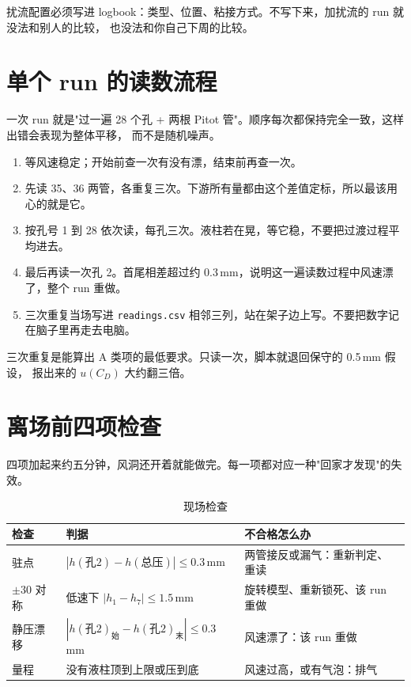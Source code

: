 \documentclass[11pt,a4paper]{ctexart}
\newcommand{\CD}{\ensuremath{C_D}}
\begin{document}
扰流配置必须写进 logbook：类型、位置、粘接方式。不写下来，加扰流的 run 就没法和别人的比较，
也没法和你自己下周的比较。

\section{单个 run 的读数流程}

一次 run 就是"过一遍 28 个孔 + 两根 Pitot 管"。顺序每次都保持完全一致，这样出错会表现为整体平移，
而不是随机噪声。

\begin{enumerate}[leftmargin=1.5em,itemsep=3pt]
\item 等风速稳定；开始前查一次有没有漂，结束前再查一次。
\item 先读 35、36 两管，各重复三次。下游所有量都由这个差值定标，所以最该用心的就是它。
\item 按孔号 1 到 28 依次读，每孔三次。液柱若在晃，等它稳，不要把过渡过程平均进去。
\item 最后再读一次孔 2。首尾相差超过约 0.3\,mm，说明这一遍读数过程中风速漂了，整个 run 重做。
\item 三次重复当场写进 \texttt{readings.csv} 相邻三列，站在架子边上写。不要把数字记在脑子里再走去电脑。
\end{enumerate}

三次重复是能算出 A 类项的最低要求。只读一次，脚本就退回保守的 0.5\,mm 假设，
报出来的 $u(\CD)$ 大约翻三倍。

\section{离场前四项检查}

四项加起来约五分钟，风洞还开着就能做完。每一项都对应一种"回家才发现"的失效。

\begin{table}[H]
\centering
\caption{现场检查}
\small
\begin{tabularx}{\textwidth}{@{}p{3.6cm} X p{6.2cm}@{}}
\toprule
检查 & 判据 & 不合格怎么办 \\
\midrule
驻点 & $|h(\text{孔2}) - h(\text{总压})| \leq 0.3$\,mm & 两管接反或漏气：重新判定、重读 \\
$\pm30$ 对称 & 低速下 $|h_1 - h_7| \leq 1.5$\,mm & 旋转模型、重新锁死、该 run 重做 \\
静压漂移 & $|h(\text{孔2})_{\text{始}} - h(\text{孔2})_{\text{末}}| \leq 0.3$\,mm & 风速漂了：该 run 重做 \\
量程 & 没有液柱顶到上限或压到底 & 风速过高，或有气泡：排气 \\
\bottomrule
\end{tabularx}
\end{table}
\end{document}
